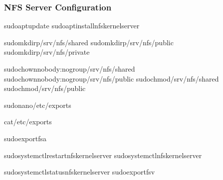 \documentclass[letterpaper,10pt,english]{sphinxmanual}
\begin{document}
\subsubsection{NFS Server Configuration}
\label{\detokenize{network-storage:nfs-server-configuration}}
\begin{sphinxVerbatim}[commandchars=\\\{\}]
sudoaptupdate
sudoaptinstallnfs\PYGZhy{}kernel\PYGZhy{}server

sudomkdir\PYGZhy{}p/srv/nfs/shared
sudomkdir\PYGZhy{}p/srv/nfs/public
sudomkdir\PYGZhy{}p/srv/nfs/private

sudochownnobody:nogroup/srv/nfs/shared
sudochownnobody:nogroup/srv/nfs/public
sudochmod/srv/nfs/shared
sudochmod/srv/nfs/public

sudonano/etc/exports

cat\PYGZgt{}\PYGZgt{}/etc/exports

sudoexportfs\PYGZhy{}a

sudosystemctlrestartnfs\PYGZhy{}kernel\PYGZhy{}server
sudosystemctlnfs\PYGZhy{}kernel\PYGZhy{}server

sudosystemctlstatusnfs\PYGZhy{}kernel\PYGZhy{}server
sudoexportfs\PYGZhy{}v
\end{sphinxVerbatim}
\end{document}
